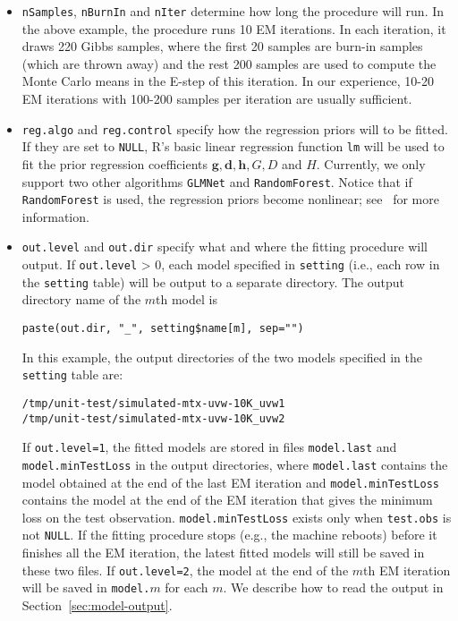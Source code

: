 \documentclass[10pt]{article}
\begin{document}
\begin{itemize}
\item {\tt nSamples}, {\tt nBurnIn} and {\tt nIter} determine how long the procedure will run.  In the above example, the procedure runs 10 EM iterations.  In each iteration, it draws 220 Gibbs samples, where the first 20 samples are burn-in samples (which are thrown away) and the rest 200 samples are used to compute the Monte Carlo means in the E-step of this iteration.  In our experience, 10-20 EM iterations with 100-200 samples per iteration are usually sufficient.
\item {\tt reg.algo} and {\tt reg.control} specify how the regression priors will to be fitted.  If they are set to {\tt NULL}, R's basic linear regression function {\tt lm} will be used to fit the prior regression coefficients $\bm{g}, \bm{d}, \bm{h}, G, D$ and $H$.  Currently, we only support two other algorithms {\tt GLMNet} and {\tt RandomForest}.  Notice that if {\tt RandomForest} is used, the regression priors become nonlinear; see~\cite{gmf:recsys11} for more information.
\item {\tt out.level} and {\tt out.dir} specify what and where the fitting procedure will output.  If {\tt out.level} > 0, each model specified in {\tt setting} (i.e., each row in the {\tt setting} table) will be output to a separate directory.  The output directory name of the $m$th model is
{\small\begin{verbatim}
paste(out.dir, "_", setting$name[m], sep="")
\end{verbatim}}
In this example, the output directories of the two models specified in the {\tt setting} table are:
{\small\begin{verbatim}
/tmp/unit-test/simulated-mtx-uvw-10K_uvw1
/tmp/unit-test/simulated-mtx-uvw-10K_uvw2
\end{verbatim}}
If {\tt out.level=1}, the fitted models are stored in files {\tt model.last} and {\tt model.minTestLoss} in the output directories, where {\tt model.last} contains the model obtained at the end of the last EM iteration and {\tt model.minTestLoss} contains the model at the end of the EM iteration that gives the minimum loss on the test observation.  {\tt model.minTestLoss} exists only when {\tt test.obs} is not {\tt NULL}.  If the fitting procedure stops (e.g., the machine reboots) before it finishes all the EM iteration, the latest fitted models will still be saved in these two files.  If {\tt out.level=2}, the model at the end of the $m$th EM iteration will be saved in {\tt model.$m$} for each $m$.  We describe how to read the output in Section~\ref{sec:model-output}.
\end{itemize}
\end{document}
